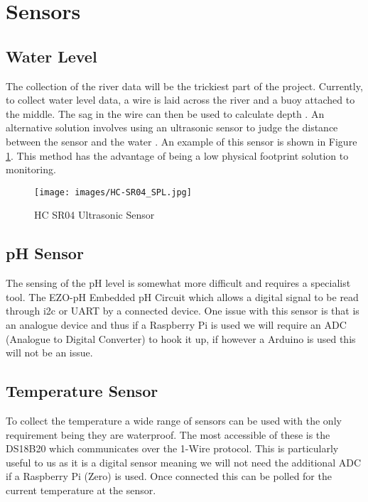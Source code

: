 \section{Sensors}
\subsection{Water Level}
The collection of the river data will be the trickiest part of the project. Currently, to collect water level data, a wire is laid across the river and a buoy attached to the middle. The sag in the wire can then be used to calculate depth \citep{SEPA2016}. An alternative solution involves using an ultrasonic sensor to judge the distance between the sensor and the water \citep{AravindJayan2016}. An example of this sensor is shown in Figure \ref{fig:hcsr04}. This method has the advantage of being a low physical footprint solution to monitoring. 

\begin{figure}[H]
	\centering
	\texttt{[image: images/HC-SR04\_SPL.jpg]}\\
	\caption{ HC SR04 Ultrasonic Sensor \citep{MouserElectronics}}
	\label{fig:hcsr04}
\end{figure}

\subsection{pH Sensor}
The sensing of the pH level is somewhat more difficult and requires a specialist tool. The EZO-pH Embedded pH Circuit \citep{AtlasScientific2018a} which allows a digital signal to be read through i2c or UART by a connected device. \cite{Dey2018} One issue with this sensor is that is an analogue device and thus if a Raspberry Pi is used we will require an ADC (Analogue to Digital Converter) to hook it up, if however a Arduino is used this will not be an issue.

\subsection{Temperature Sensor}
To collect the temperature a wide range of sensors can be used with the only requirement being they are waterproof. The most accessible of these is the DS18B20 \citep{DS18B20} which communicates over the 1-Wire protocol. This is particularly useful to us as it is a digital sensor meaning we will not need the additional ADC if a Raspberry Pi (Zero) is used. Once connected this can be polled for the current temperature at the sensor. \citep{Monk2013}